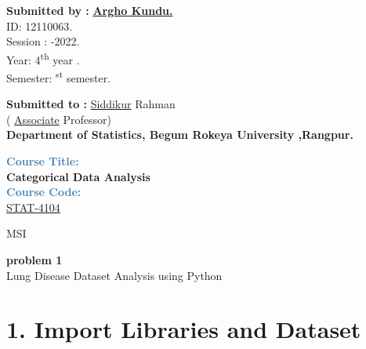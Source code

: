 \documentclass[12pt]{article}
\begin{document}
\begin{minipage}[t]{0.48\textwidth}
    \textbf{\large Submitted by :} \quad \textbf{\underline{Argho Kundu.}}\\[0.4cm]
    \hspace{1.5cm} ID: \hspace{1.3cm} 12110063.\\[0.3cm]
    \hspace{1.5cm} Session \; : -2022.\\[0.3cm]
    \hspace{1.5cm} Year: \hspace{1.1cm} 4\textsuperscript{th} year .\\[0.3cm]
    \hspace{1.5cm} Semester: \textsuperscript{st} semester.

    \vspace{1.5cm}

    \textbf{\large Submitted to :} \quad \underline{Siddikur} Rahman\\[0.3cm]
    \hspace{3.0cm} ( \underline{Associate} \; Professor)\\[0.5cm]
    \textbf{Department of Statistics, Begum Rokeya University ,Rangpur.}
\end{minipage}%
\hfill
\begin{minipage}[t]{0.44\textwidth}
    \vspace{5.5cm}

    \textcolor{steelblue}{\textbf{Course Title:}}\\[0.2cm]
    \hspace{0.8cm} \textbf{Categorical Data Analysis}\\[0.5cm]
    \textcolor{steelblue}{\textbf{Course Code:}}\\[0.2cm]
    \hspace{0.8cm} \underline{STAT-4104}
\end{minipage}

\vfill
\hfill \small MSI

\newpage
\pagestyle{plain}

\begin{center}
    {\LARGE \textbf{ problem 1}}\\[0.3cm]
    {\large Lung Disease Dataset Analysis using Python}
\end{center}




\section*{1. Import Libraries and Dataset}
\end{document}
